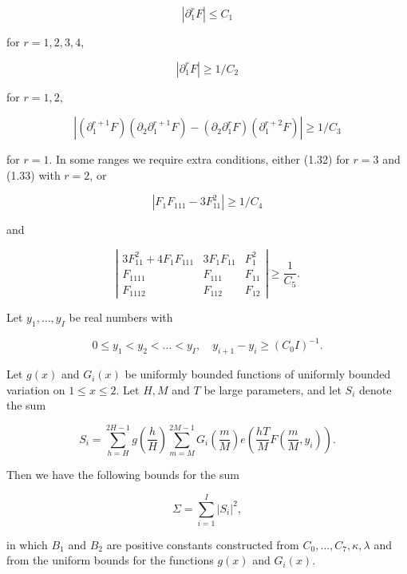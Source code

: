 \documentclass[10pt]{article}
\begin{document}
$$
\left|\partial_{1}^{r} F\right| \leqslant C_{1}
$$

for $r=1,2,3,4$,


\begin{equation*}
\left|\partial_{1}^{r} F\right| \geqslant 1 / C_{2} \tag{1.32}
\end{equation*}


for $r=1,2$,


\begin{equation*}
\left|\left(\partial_{1}^{r+1} F\right)\left(\partial_{2} \partial_{1}^{r+1} F\right)-\left(\partial_{2} \partial_{1}^{r} F\right)\left(\partial_{1}^{r+2} F\right)\right| \geqslant 1 / C_{3} \tag{1.33}
\end{equation*}


for $r=1$. In some ranges we require extra conditions, either (1.32) for $r=3$ and (1.33) with $r=2$, or


\begin{equation*}
\left|F_{1} F_{111}-3 F_{11}^{2}\right| \geqslant 1 / C_{4} \tag{1.34}
\end{equation*}


and

\begin{equation*}
\left|
\begin{array}{ccc}
3 F_{11}^{2}+4 F_{1} F_{111} & 3 F_{1} F_{11} & F_{1}^{2} \\
F_{1111} & F_{111} & F_{11} \\
F_{1112} & F_{112} & F_{12}
\end{array}
\right| \geqslant \frac{1}{C_{5}}. \tag{1.35}
\end{equation*}

Let $y_{1}, \ldots, y_{I}$ be real numbers with

$$
0 \leqslant y_{1}<y_{2}<\ldots<y_{I}, \quad y_{i+1}-y_{i} \geqslant\left(C_{0} I\right)^{-1}.
$$

Let $g(x)$ and $G_{i}(x)$ be uniformly bounded functions of uniformly bounded variation on $1 \leqslant x \leqslant 2$. Let $H, M$ and $T$ be large parameters, and let $S_{i}$ denote the sum

$$
S_{i}=\sum_{h=H}^{2 H-1} g\left(\frac{h}{H}\right) \sum_{m=M}^{2 M-1} G_{i}\left(\frac{m}{M}\right) e\left(\frac{h T}{M} F\left(\frac{m}{M}, y_{i}\right)\right).
$$

Then we have the following bounds for the sum

$$
\Sigma=\sum_{i=1}^{I}\left|S_{i}\right|^{2},
$$

in which $B_{1}$ and $B_{2}$ are positive constants constructed from $C_{0}, \ldots, C_{7}, \kappa, \lambda$ and from the uniform bounds for the functions $g(x)$ and $G_{i}(x)$.
\end{document}
